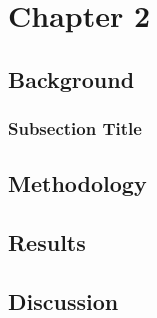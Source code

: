 \chapter{Chapter 2}\label{ch:chapter2}
\lipsum[1-2] %

\section{Background}
\lipsum[3-4] %

\subsection{Subsection Title}
\lipsum[5] %

\section{Methodology}
\lipsum[6-7] %

\section{Results}
\lipsum[8-9] %

\section{Discussion}
\lipsum[10] %
